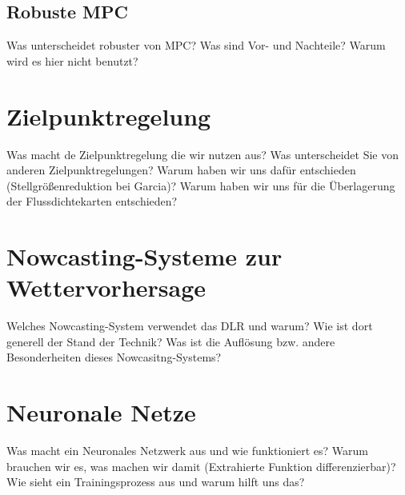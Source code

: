 \subsection{Robuste MPC} \label{subsec_RobusteMPC}
Was unterscheidet robuster von  MPC? Was sind Vor- und Nachteile?
Warum wird es hier nicht benutzt?

\section{Zielpunktregelung} \label{sec_Zielpunktregelung}
Was macht de Zielpunktregelung die wir nutzen aus?
Was unterscheidet Sie von anderen Zielpunktregelungen?
Warum haben wir uns dafür entschieden (Stellgrößenreduktion bei Garcia)?
Warum haben wir uns für die Überlagerung der Flussdichtekarten entschieden?

\section{Nowcasting-Systeme zur Wettervorhersage} \label{sec_Nowcasting}
Welches Nowcasting-System verwendet das DLR und warum?
Wie ist dort generell der Stand der Technik?
Was ist die Auflösung bzw. andere Besonderheiten dieses Nowcasitng-Systems?

\section{Neuronale Netze} \label{sec_NN}
Was macht ein Neuronales Netzwerk aus und wie funktioniert es?
Warum brauchen wir es, was machen wir damit (Extrahierte Funktion differenzierbar)?
Wie sieht ein Trainingsprozess aus und warum hilft uns das?
